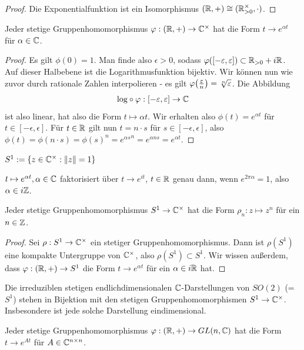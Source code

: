 \documentclass{report}
\begin{document}
\begin{proof}
	Die Exponentialfunktion ist ein Isomorphismus $(\mathbb{R}, +) \cong (\mathbb{R}^\times_{> 0}, \cdot)$.
\end{proof}
\begin{theorem}
	Jeder stetige Gruppenhomomorphismus $\varphi : (\mathbb{R},+) \to \mathbb{C}^\times$ hat die Form $t \to e^{\alpha t}$ für $\alpha \in \mathbb{C}$.
\end{theorem}
\begin{proof}
	Es gilt $\phi(0) = 1$. Man finde also $\epsilon > 0$, sodass $\varphi([-\varepsilon,\varepsilon]) \subset \mathbb{R}_{> 0} + i\mathbb{R}$. Auf dieser Halbebene ist die Logarithmusfunktion bijektiv. Wir können nun wie zuvor durch rationale Zahlen interpolieren - es gilt $\varphi\qty(\frac{\varepsilon}{n}) = \sqrt[n]{\varepsilon}$. Die Abbildung 
	\begin{align*}
		\textnormal{log} \circ \varphi : [-\varepsilon, \varepsilon] \to \mathbb{C}
	\end{align*} 
	ist also linear, hat also die Form $t \mapsto \alpha t$. Wir erhalten also $\phi(t) = e^{\alpha t}$ für $t \in [-\epsilon, \epsilon]$. Für $t \in \mathbb{R}$ gilt nun $t = n \cdot s$ für $s \in [-\epsilon, \epsilon]$, also $\phi(t) = \phi(n \cdot s) = \phi(s)^n = {e^{\alpha s}}^n = e^{\alpha ns} = e^{\alpha t}$.
\end{proof}
\begin{definition}
	$S^1 := \qty{z \in \mathbb{C}^\times : \norm{z} = 1}$
\end{definition}
\begin{proposition}
	$t \mapsto e^{\alpha t}, \alpha \in \mathbb{C}$ faktorisiert über $t \to e^{it}$, $t \in \mathbb{R}$ genau dann, wenn $e^{2\pi\alpha} = 1$, also $\alpha \in i \mathbb{Z}$.
\end{proposition}
\begin{theorem}
	Jeder stetige Gruppenhomomorphismus $S^1 \to \mathbb{C}^\times$ hat die Form $\rho_n : z \mapsto z^n$ für ein $n \in \mathbb{Z}$.
\end{theorem}
\begin{proof}
	Sei $\rho : S^1 \to \mathbb{C}^\times$ ein stetiger Gruppenhomomorphismus. Dann ist $\rho(S^1)$ eine kompakte Untergruppe von $\mathbb{C}^\times$, also $\rho(S^1) \subset S^1$. Wir wissen außerdem, dass $\varphi : (\mathbb{R}, +) \to S^1$ die Form $t \to e^{\alpha t}$ für ein $\alpha \in i \mathbb{R}$ hat.
\end{proof}
\begin{theorem}
	Die irreduziblen stetigen endlichdimensionalen $\mathbb{C}$-Darstellungen von $SO(2)$ (= $S^1$) stehen in Bijektion mit den stetigen Gruppenhomomorphismen $S^1 \to \mathbb{C}^\times$. Insbesondere ist jede solche Darstellung eindimensional.
\end{theorem}
\begin{theorem}
	Jeder stetige Gruppenhomomorphismus $\varphi : (\mathbb{R},+) \to GL(n, \mathbb{C})$ hat die Form $t \to e^{A t}$ für $A \in \mathbb{C}^{n \times n}$.
\end{theorem}
\end{document}
